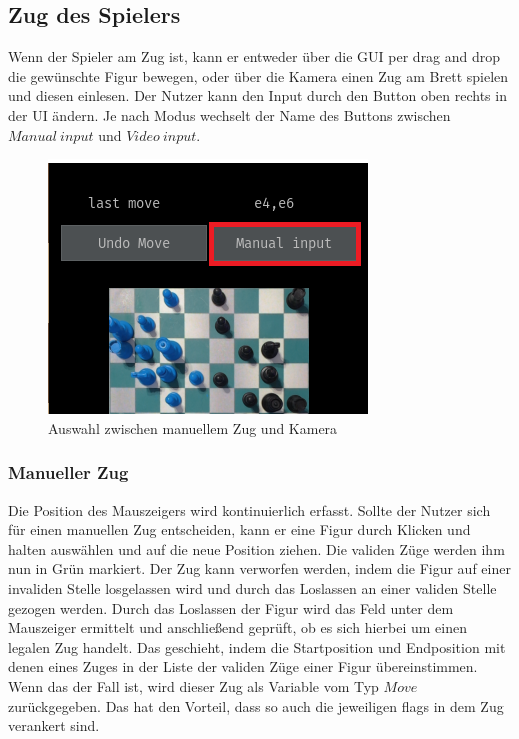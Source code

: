 \subsection{Zug des Spielers}
Wenn der Spieler am Zug ist, kann er entweder über die GUI per drag and drop die gewünschte Figur bewegen, 
oder über die Kamera einen Zug am Brett spielen und diesen einlesen. Der Nutzer kann den Input durch den Button oben rechts in der UI ändern.
Je nach Modus wechselt der Name des Buttons zwischen \(Manual~input\) und \(Video~input\).

\begin{figure}[H]
    \centering
    \includegraphics[scale=0.8]{images/manual_camera_input_button.png}
    \caption{Auswahl zwischen manuellem Zug und Kamera}
\end{figure} 

\subsubsection{Manueller Zug}
Die Position des Mauszeigers wird kontinuierlich erfasst. Sollte der Nutzer sich für einen manuellen Zug entscheiden, kann er eine Figur durch Klicken und halten auswählen 
und auf die neue Position ziehen. Die validen Züge werden ihm nun in Grün markiert. Der Zug kann verworfen werden, indem die Figur auf einer invaliden Stelle losgelassen wird 
und durch das Loslassen an einer validen Stelle gezogen werden.
Durch das Loslassen der Figur wird das Feld unter dem Mauszeiger ermittelt und anschließend geprüft, ob es sich hierbei um einen legalen Zug handelt.
Das geschieht, indem die Startposition und Endposition mit denen eines Zuges in der Liste der validen Züge einer Figur übereinstimmen. Wenn das der Fall ist, 
wird dieser Zug als Variable vom Typ \(Move\) zurückgegeben. Das hat den Vorteil, dass so auch die jeweiligen flags in dem Zug verankert sind.

